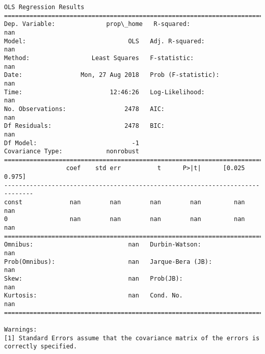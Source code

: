 \documentclass[11pt]{article}
\begin{document}
    \begin{Verbatim}[commandchars=\\\{\}]
                            OLS Regression Results                            
==============================================================================
Dep. Variable:              prop\_home   R-squared:                         nan
Model:                            OLS   Adj. R-squared:                    nan
Method:                 Least Squares   F-statistic:                       nan
Date:                Mon, 27 Aug 2018   Prob (F-statistic):                nan
Time:                        12:46:26   Log-Likelihood:                    nan
No. Observations:                2478   AIC:                               nan
Df Residuals:                    2478   BIC:                               nan
Df Model:                          -1                                         
Covariance Type:            nonrobust                                         
==============================================================================
                 coef    std err          t      P>|t|      [0.025      0.975]
------------------------------------------------------------------------------
const             nan        nan        nan        nan         nan         nan
0                 nan        nan        nan        nan         nan         nan
==============================================================================
Omnibus:                          nan   Durbin-Watson:                     nan
Prob(Omnibus):                    nan   Jarque-Bera (JB):                  nan
Skew:                             nan   Prob(JB):                          nan
Kurtosis:                         nan   Cond. No.                          nan
==============================================================================

Warnings:
[1] Standard Errors assume that the covariance matrix of the errors is correctly specified.

    \end{Verbatim}
\end{document}
